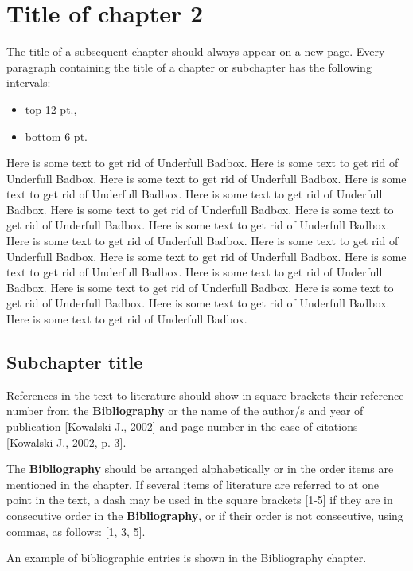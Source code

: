 \chapter{Title of chapter 2}

The title of a subsequent chapter should always appear on a new page. Every paragraph containing the title of a chapter or subchapter has the following intervals:
\begin{itemize}
	\item top 12 pt., 
	\item bottom 6 pt.
\end{itemize}

Here is some text to get rid of Underfull Badbox. Here is some text to get rid of Underfull Badbox. Here is some text to get rid of Underfull Badbox. Here is some text to get rid of Underfull Badbox. Here is some text to get rid of Underfull Badbox. Here is some text to get rid of Underfull Badbox. Here is some text to get rid of Underfull Badbox. Here is some text to get rid of Underfull Badbox. Here is some text to get rid of Underfull Badbox. Here is some text to get rid of Underfull Badbox. Here is some text to get rid of Underfull Badbox. Here is some text to get rid of Underfull Badbox. Here is some text to get rid of Underfull Badbox. Here is some text to get rid of Underfull Badbox. Here is some text to get rid of Underfull Badbox. Here is some text to get rid of Underfull Badbox. Here is some text to get rid of Underfull Badbox.



\section{Subchapter title}

References in the text to literature should show in square brackets their reference number from the \textbf{Bibliography} \cite{html5-perf} or the name of the author/s and year of publication [Kowalski J., 2002] and page number in the case of citations [Kowalski J., 2002, p. 3].

The \textbf{Bibliography} should be arranged alphabetically or in the order items are mentioned in the chapter. If several items of literature are referred to at one point in the text, a dash may be used in the square brackets [1-5] if they are in consecutive order in the \textbf{Bibliography}, or if their order is not consecutive, using commas, as follows: [1, 3, 5]. 

An example of bibliographic entries is shown in the Bibliography chapter.

